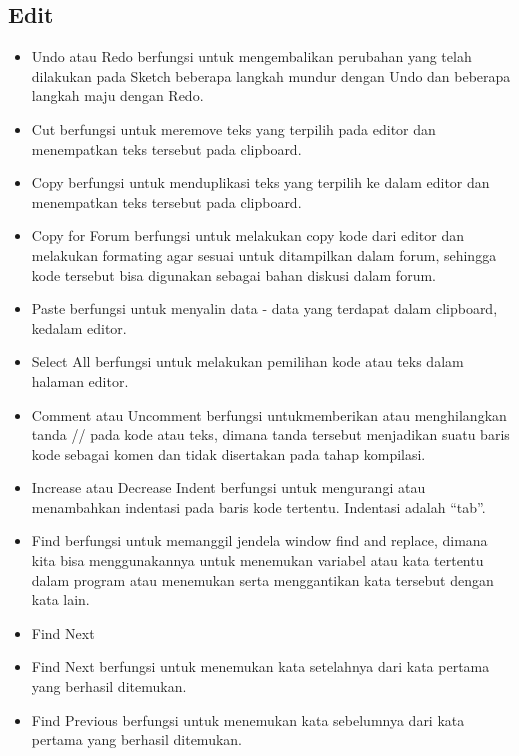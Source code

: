 \begin{itemize}
\subsection{Edit}
\begin{itemize}
\item Undo atau Redo berfungsi untuk mengembalikan perubahan yang telah dilakukan pada Sketch beberapa langkah mundur dengan Undo dan beberapa langkah maju dengan Redo.
\item Cut berfungsi untuk meremove teks yang terpilih pada editor dan menempatkan teks tersebut pada clipboard.
\item Copy berfungsi untuk menduplikasi teks yang terpilih ke dalam editor dan menempatkan teks tersebut pada clipboard.
\item Copy for Forum berfungsi untuk melakukan copy kode dari editor dan melakukan formating agar sesuai untuk ditampilkan dalam forum, sehingga kode tersebut bisa digunakan sebagai bahan diskusi dalam forum.
\item Paste berfungsi untuk menyalin data - data yang terdapat dalam clipboard, kedalam editor.
\item Select All berfungsi untuk melakukan pemilihan kode atau teks dalam halaman editor.
\item Comment atau Uncomment berfungsi untukmemberikan atau menghilangkan tanda // pada kode atau teks, dimana tanda tersebut menjadikan suatu baris kode sebagai komen dan tidak disertakan pada tahap kompilasi.
\item Increase atau Decrease Indent berfungsi untuk mengurangi atau menambahkan indentasi pada baris kode tertentu. Indentasi adalah “tab”.
\item Find berfungsi untuk memanggil jendela window find and replace, dimana kita bisa menggunakannya untuk menemukan variabel atau kata tertentu dalam program atau menemukan serta menggantikan kata tersebut dengan kata lain.
\item Find Next 

\item Find Next berfungsi untuk menemukan kata setelahnya dari kata pertama yang berhasil ditemukan.
\item Find Previous berfungsi untuk menemukan kata sebelumnya dari kata pertama yang berhasil ditemukan.
\end{itemize}	

 

\end{itemize}

